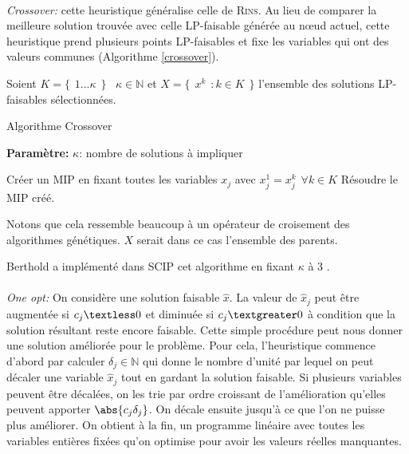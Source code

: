 \documentclass[12pt,a4paper,oneside]{book}
\theoremstyle{definition}
\newcommand{\N}{\mathbb{N}}
\begin{document}
	\paragraph{}
	\textit{Crossover:} cette heuristique généralise celle de \textsc{Rins}. Au lieu de comparer la meilleure solution trouvée avec celle LP-faisable générée au nœud actuel, cette heuristique prend plusieurs points LP-faisables et fixe les variables qui ont des valeurs communes (Algorithme \ref{crossover}).
	
	Soient $K =  \{\hspace{5pt}1...\kappa \hspace{5pt}\} \hspace{10pt} \kappa \in \N $ et  $X = \{\hspace{5pt} x^k \hspace{5pt} : k \in K \hspace{5pt}\}$ l'ensemble des solutions LP-faisables sélectionnées.

	\begin{algorithm}\label{crossover}
		\caption{Algorithme Crossover}
		\SetAlgoLined
		\DontPrintSemicolon
		
		\textbf{Paramètre:} $\kappa$: nombre de solutions à impliquer \;
		
		{
			Créer un MIP en fixant toutes les variables $x_j$ avec $x^1_j = x^k_j \hspace{5pt} \forall k \in K$ \;
			Résoudre le MIP créé.
		}
		
	\end{algorithm}

	Notons que cela ressemble beaucoup à un opérateur de croisement des algorithmes génétiques. $X$ serait dans ce cas l'ensemble des parents.
	
	Berthold a implémenté dans SCIP cet algorithme en fixant $\kappa$ à 3 \cite{Hendel2011}.
	
	
	\paragraph{}
	\textit{One opt:} On considère une solution faisable $\hat{x}$. La valeur de $\hat{x}_j$ peut être augmentée si $ c_j \textless 0 $ et diminuée si $ c_j \textgreater 0$ à condition que la solution résultant reste encore faisable. Cette simple procédure peut nous donner une solution améliorée pour le problème. Pour cela, l'heuristique commence d'abord par calculer $\delta_j \in \N$ qui donne le nombre d'unité par lequel on peut décaler une variable $\hat{x}_j$ tout en gardant la solution faisable. Si plusieurs variables peuvent être décalées, on les trie par ordre croissant de l'amélioration qu'elles peuvent apporter $\abs{c_j \delta_j}$. On décale ensuite jusqu'à ce que l'on ne puisse plus améliorer. On obtient à la fin, un programme linéaire avec toutes les variables entières fixées qu'on optimise pour avoir les valeurs réelles manquantes.
	
\end{document}
